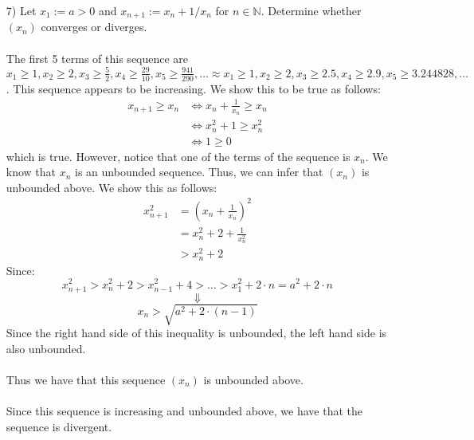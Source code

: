 \documentclass[12pt,letterpaper]{article}
\newcommand{\N}{\mathbb{N}}
\theoremstyle{case}
\theoremstyle{definition}
\begin{document}
\begin{enumerate}
\begin{enumerate}
\begin{enumerate}
\begin{proof}
				\\\\So,
				\begin{align*}
					x_{n+1} &= 1+\sqrt{x_n -1} \\
					&\geq 1+\sqrt{2 -1} \\
					&=1 + 1 \\
					&= 2
				\end{align*}
				Thus, $x_n \geq 2,\ \forall\ n \in \N$. By the definition of boundedness, we have that $(x_n)$ is bounded below by 2.
			\end{proof}
			
			Since we have also shown earlier that $(x_n)$ is monotone decreasing, we have that by the monotone sequence property, since $(x_n)$ is bounded, $(x_n)$ converges, and since $(x_n)$ is monotone decreasing, we have:
			\begin{align*}
				\lim (x_n) &= \inf \{x_n:n \in \N\} \\
				&=2
			\end{align*}
			
			\item[7)] Let $x_1 := a>0$ and $x_{n+1} := x_n+1/x_n$ for $n \in \N$. Determine whether $(x_n)$ converges or diverges.
			\\\\The first 5 terms of this sequence are $x_1 \geq 1, x_2 \geq 2, x_3 \geq \frac{5}{2}, x_4 \geq \frac{29}{10}, x_5 \geq \frac{941}{290}, \dots \approx x_1 \geq 1, x_2 \geq 2, x_3 \geq 2.5, x_4 \geq 2.9, x_5 \geq 3.244828, \dots$. This sequence appears to be increasing. We show this to be true as follows:
			\begin{align*}
				x_{n+1} \geq x_n &\iff x_n + \frac{1}{x_n} \geq x_n \\
				&\iff x_n^2 + 1 \geq x_n^2 \\
				&\iff 1 \geq 0
			\end{align*}
			which is true.
			However, notice that one of the terms of the sequence is $x_n$. We know that $x_n$ is an unbounded sequence. Thus, we can infer that $(x_n)$ is unbounded above. We show this as follows:
			\begin{align*}
				x_{n+1}^2 &= \left(x_n + \frac{1}{x_n} \right)^2 \\
				&= x_n^2+2+\frac{1}{x_n^2} \\
				&> x_n^2 +2
			\end{align*}
			Since:
			\[x_{n+1}^2 > x_n^2+2 > x_{n-1}^2 +4 > \dots > x_1^2+2 \cdot n = a^2+2 \cdot n\]
			\[\Downarrow\]
			\[x_n > \sqrt{a^2 + 2 \cdot (n-1)}\]
			Since the right hand side of this inequality is unbounded, the left hand side is also unbounded.
			\\\\Thus we have that this sequence $(x_n)$ is unbounded above.
			\\\\Since this sequence is increasing and unbounded above, we have that the sequence is divergent.\\
			

\end{enumerate}
\end{enumerate}
\end{enumerate}
\end{document}
